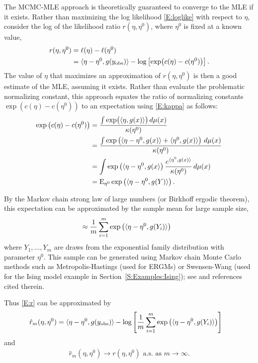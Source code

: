 The MCMC-MLE approach is theoretically guaranteed to converge to the MLE if it exists.  
Rather than maximizing the log likelihood \eqref{E:loglike}
with respect to $\eta$, \citeauthor{Geyer:1992} consider 
the log of the likelihood ratio $r( \eta, \eta^0 )$, where $\eta^0$ 
is fixed at a known value,
\begin{align}
 r( \eta, \eta^0 ) &= \ell( \eta ) - \ell( \eta^0 ) \notag \\ 
				  &= \langle  \eta - \eta^0, g(y_{\textrm{obs}}) \rangle - \log \left [ \exp \bigl( c(\eta) - c(\eta^0) \bigr) \right ].\label{E:r}
\end{align}
The value of $\eta$ that maximizes an
approximation of $r( \eta, \eta^0 )$ is then a good estimate of the MLE, 
assuming it exists.  Rather than evaluate the problematic normalizing constant,
this approach equates the ratio of normalizing constants 
$\exp \left (  c(\eta) - c(\eta^0) \right )$ to an expectation 
using \eqref{E:kappa} as follows:
\begin{align*}
	\exp \left (  c(\eta) - c(\eta^0) \right ) &= \frac{ \int \exp \bigl ( \langle  \eta, g(x)  \rangle\bigr ) \, d\mu(x) }{ \kappa(\eta^0)  } \\
	&= \frac{ \int \exp \left ( \langle  \eta - \eta^0, g(x) \rangle + \langle  \eta^0, g(x) \rangle \right ) \, d\mu(x)  }{ \kappa(\eta^0) } \\
	&= \int \exp \left( \langle \eta - \eta^0, g(x \rangle \right ) \frac{ e^ { \langle  \eta^0, g(x) \rangle } }{ \kappa(\eta^0) } \, d\mu(x)\\
	&= \operatorname{E}_{\eta^0} \exp \left( \langle  \eta - \eta^0, g(Y) \rangle  \right ) .
\end{align*}

By the Markov chain strong law of large numbers (or Birkhoff ergodic theorem), this 
expectation can be approximated by the sample mean for large sample size,
\begin{align*}
	&\approx \frac{1}{m} \sum_{i=1}^{m}\exp \left ( \langle  \eta - \eta^0,g(Y_i) \rangle \right )
\end{align*}
where $Y_1, \ldots, Y_m$ are draws from the exponential family distribution with 
parameter $\eta^0$.  This sample can be generated using Markov chain Monte Carlo 
methods such as Metropolis-Hastings (used for ERGMs) or Swensen-Wang (used for the Ising model example in Section~\ref{S:Examples:Ising}); see 
\citep{Brooks} and references cited therein.

Thus \eqref{E:r} can be approximated by
\begin{align}
\hat{r}_m( \eta, \eta^0 ) &= \langle  \eta - \eta^0, g(y_{\textrm{obs}}) \rangle - \log 
	\left [ \frac{1}{m} \sum_{i=1}^{m} \exp \left ( \langle  \eta - \eta^0, g(Y_i) \rangle \right ) \right ] 
	\label{E:r_hat}
\end{align}
and 
\begin{align*}
	\hat{r}_m( \eta, \eta^0 ) \to r( \eta, \eta^0 ) \text{ a.s. as $m \to \infty$}.
\end{align*}

